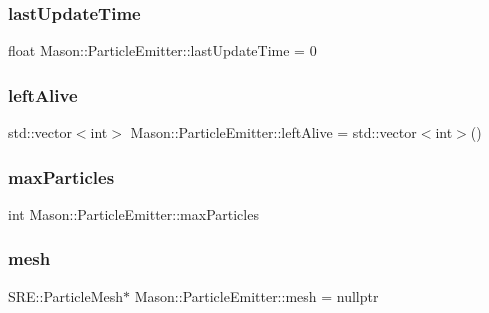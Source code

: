\subsubsection{\texorpdfstring{last\+Update\+Time}{lastUpdateTime}}
{\footnotesize\ttfamily float Mason\+::\+Particle\+Emitter\+::last\+Update\+Time = 0\hspace{0.3cm}{\ttfamily [protected]}}

\hypertarget{class_mason_1_1_particle_emitter_a1c66e387ee5824b69e72efe37d5ce850}{}\label{class_mason_1_1_particle_emitter_a1c66e387ee5824b69e72efe37d5ce850} 
\subsubsection{\texorpdfstring{left\+Alive}{leftAlive}}
{\footnotesize\ttfamily std\+::vector$<$int$>$ Mason\+::\+Particle\+Emitter\+::left\+Alive = std\+::vector$<$int$>$()\hspace{0.3cm}{\ttfamily [protected]}}

\hypertarget{class_mason_1_1_particle_emitter_a591a7ed2fc6cded5dc19b144ece7b3fb}{}\label{class_mason_1_1_particle_emitter_a591a7ed2fc6cded5dc19b144ece7b3fb} 
\subsubsection{\texorpdfstring{max\+Particles}{maxParticles}}
{\footnotesize\ttfamily int Mason\+::\+Particle\+Emitter\+::max\+Particles\hspace{0.3cm}{\ttfamily [protected]}}

\hypertarget{class_mason_1_1_particle_emitter_ab144b5872ad3b63652f8a079069f4cd0}{}\label{class_mason_1_1_particle_emitter_ab144b5872ad3b63652f8a079069f4cd0} 
\subsubsection{\texorpdfstring{mesh}{mesh}}
{\footnotesize\ttfamily S\+R\+E\+::\+Particle\+Mesh$\ast$ Mason\+::\+Particle\+Emitter\+::mesh = nullptr\hspace{0.3cm}{\ttfamily [protected]}}

